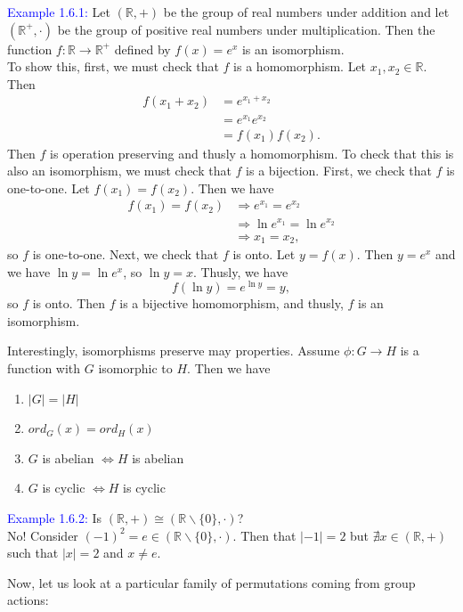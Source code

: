 \documentclass{article}
\begin{document}
\textcolor{blue}{Example 1.6.1:} Let $(\mathbb{R},+)$ be the group of real numbers under addition and let $(\mathbb{R}^+, \cdot)$ be the 
group of positive real numbers under multiplication. Then the function $f:\mathbb{R} \longrightarrow \mathbb{R}^+$ defined by $f(x)=e^x$ 
is an isomorphism. \\
To show this, first, we must check that $f$ is a homomorphism. Let $x_1, x_2 \in \mathbb{R}$. Then
\begin{align*}
    f(x_1+x_2) &= e^{x_1+x_2} \\
    &= e^{x_1}e^{x_2} \\
    &= f(x_1)f(x_2).
\end{align*}
Then $f$ is operation preserving and thusly a homomorphism. To check that this is also an isomorphism, we must check that $f$ is a 
bijection. First, we check that $f$ is one-to-one. Let $f(x_1)=f(x_2)$. Then we have 
\begin{align*}
    f(x_1)=f(x_2) &\Longrightarrow e^{x_1} = e^{x_2} \\
    &\Longrightarrow \ln{e^{x_1}} = \ln{e^{x_2}} \\
    &\Longrightarrow x_1 = x_2,
\end{align*}
so $f$ is one-to-one. Next, we check that $f$ is onto. Let $y = f(x)$. Then $y = e^x$ and we have $\ln{y} = \ln{e^x}$, so $\ln{y}=x$. 
Thusly, we have
\[
    f(\ln{y}) = e^{\ln{y}} = y,
\]
so $f$ is onto. Then $f$ is a bijective homomorphism, and thusly, $f$ is an isomorphism. 

Interestingly, isomorphisms preserve may properties. Assume $\phi: G \longrightarrow H$ is a function with $G$ isomorphic to $H$. Then we 
have
\begin{enumerate}
    \item $|G| = |H|$ 
    \item $ord_G(x) = ord_H(x)$
    \item $G$ is abelian $\Longleftrightarrow H$ is abelian
    \item $G$ is cyclic $\Longleftrightarrow H$ is cyclic
\end{enumerate}

\textcolor{blue}{Example 1.6.2:} Is $(\mathbb{R}, +) \cong (\mathbb{R} \backslash \{0\}, \cdot)$?\\
No! Consider $(-1)^2 = e \in (\mathbb{R} \backslash \{0\}, \cdot)$. Then that $|-1| = 2$ but $\nexists x \in (\mathbb{R}, +)$ such that 
$|x|=2$ and $x \neq e$.

Now, let us look at a particular family of permutations coming from group actions:
\end{document}
